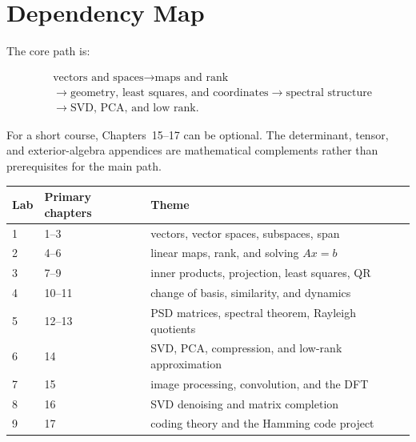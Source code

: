 \chapter*{Dependency Map}

The core path is:

\[
\begin{aligned}
&\text{vectors and spaces}
\longrightarrow
\text{maps and rank} \\
&\longrightarrow
\text{geometry, least squares, and coordinates}
\longrightarrow
\text{spectral structure} \\
&\longrightarrow
\text{SVD, PCA, and low rank}.
\end{aligned}
\]

For a short course, Chapters~15--17 can be optional. The determinant, tensor,
and exterior-algebra appendices are mathematical complements rather than
prerequisites for the main path.

\begin{center}
\begin{tabular}{lll}
\toprule
Lab & Primary chapters & Theme \\
\midrule
1 & 1--3 & vectors, vector spaces, subspaces, span \\
2 & 4--6 & linear maps, rank, and solving $Ax=b$ \\
3 & 7--9 & inner products, projection, least squares, QR \\
4 & 10--11 & change of basis, similarity, and dynamics \\
5 & 12--13 & PSD matrices, spectral theorem, Rayleigh quotients \\
6 & 14 & SVD, PCA, compression, and low-rank approximation \\
7 & 15 & image processing, convolution, and the DFT \\
8 & 16 & SVD denoising and matrix completion \\
9 & 17 & coding theory and the Hamming code project \\
\bottomrule
\end{tabular}
\end{center}
